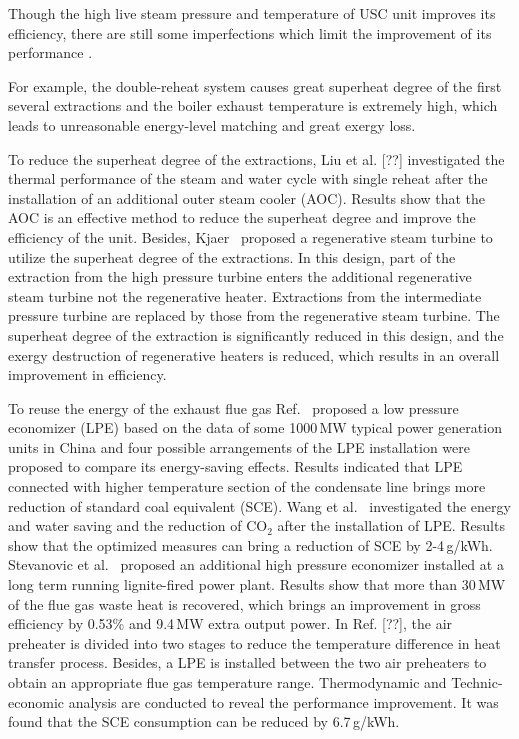 \documentclass[preprint,12pt]{elsarticle}
\begin{document}
 Though the high live steam pressure and temperature of USC unit improves its efficiency, there are still some imperfections which limit the improvement of its performance . 

For example, the double-reheat system causes great superheat degree of the first several extractions and the boiler exhaust temperature is extremely high, which leads to unreasonable energy-level matching and great exergy loss. 

To reduce the superheat degree of the extractions, Liu et al. [??] investigated the thermal performance of the steam and water cycle with single reheat after the installation of an additional outer steam cooler (AOC).
Results show that the AOC is an effective method to reduce the superheat degree and improve the efficiency of the unit.
Besides, Kjaer~\cite{Kjaer2010A} proposed a regenerative steam turbine to utilize the superheat degree of the extractions.
In this design, part of the extraction from the high pressure turbine enters the additional regenerative steam turbine not the regenerative heater.
Extractions from the intermediate pressure turbine are replaced by those from the regenerative steam turbine.
The superheat degree of the extraction is significantly reduced in this design, and the exergy destruction of regenerative heaters is reduced, which results in an overall improvement in efficiency.

To reuse the energy of the exhaust flue gas Ref.~\cite{Xu2013Techno} proposed a low pressure economizer (LPE) based on the data of some 1000\,MW typical power generation units in China and four possible arrangements of the LPE installation were proposed to compare its energy-saving effects.
Results indicated that LPE connected with higher temperature section of the condensate line brings more reduction of standard coal equivalent (SCE).
Wang et al.~\cite{Wang2012Application} investigated the energy and water saving and the reduction of CO$_2$ after the installation of LPE.
Results show that the optimized measures can bring a reduction of SCE by 2-4\,g/kWh.
Stevanovic et al.~\cite{Stevanovic2014Efficiency} proposed an additional high pressure economizer installed at a long term running lignite-fired power plant.
Results show that more than 30\,MW of the flue gas waste heat is recovered, which brings an improvement in gross efficiency by 0.53\% and 9.4\,MW extra output power.
In Ref. [??], the air preheater is divided into two stages to reduce the temperature difference in heat transfer process.
Besides, a LPE is installed between the two air preheaters to obtain an appropriate flue gas temperature range.
Thermodynamic and Technic-economic analysis are conducted to reveal the performance improvement.
It was found that the SCE consumption can be reduced by 6.7\,g/kWh. 
\end{document}
